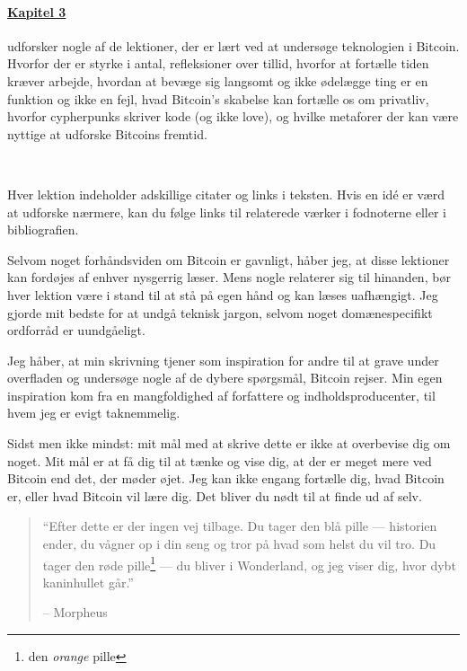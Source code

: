 \paragraph{\hyperref[ch:technology]{Kapitel 3}}{ udforsker nogle af de 
lektioner, der er lært ved at undersøge teknologien i Bitcoin. Hvorfor der er 
styrke i antal, refleksioner over tillid, hvorfor at fortælle tiden kræver 
arbejde, hvordan at bevæge sig langsomt og ikke ødelægge ting er en funktion og 
ikke en fejl, hvad Bitcoin's skabelse kan fortælle os om privatliv, hvorfor 
cypherpunks skriver kode (og ikke love), og hvilke metaforer der kan være 
nyttige at udforske Bitcoins fremtid.}

~

Hver lektion indeholder adskillige citater og links i teksten. Hvis en idé er
værd at udforske nærmere, kan du følge links til relaterede værker i
fodnoterne eller i bibliografien.

Selvom noget forhåndsviden om Bitcoin er gavnligt, håber jeg, at disse
lektioner kan fordøjes af enhver nysgerrig læser. Mens nogle relaterer sig til 
hinanden, bør hver lektion være i stand til at stå på egen hånd og kan læses 
uafhængigt. Jeg gjorde mit bedste for at undgå teknisk jargon, selvom noget 
domænespecifikt ordforråd er uundgåeligt.

Jeg håber, at min skrivning tjener som inspiration for andre til at grave under
overfladen og undersøge nogle af de dybere spørgsmål, Bitcoin rejser. Min egen
inspiration kom fra en mangfoldighed af forfattere og indholdsproducenter, til 
hvem jeg er evigt taknemmelig.

Sidst men ikke mindst: mit mål med at skrive dette er ikke at overbevise dig om 
noget. Mit mål er at få dig til at tænke og vise dig, at der er meget mere ved 
Bitcoin end det, der møder øjet. Jeg kan ikke engang fortælle dig, hvad Bitcoin 
er, eller hvad Bitcoin vil lære dig. Det bliver du nødt til at finde ud af selv.

\begin{quotation}\begin{samepage}
\enquote{Efter dette er der ingen vej tilbage. Du tager den blå pille --- 
historien ender, du vågner op i din seng og tror på hvad som helst du vil tro. 
Du tager den røde pille\footnote{den \textit{orange} pille} --- du bliver i 
Wonderland, og jeg viser dig, hvor dybt kaninhullet går.}
\begin{flushright} -- Morpheus
\end{flushright}\end{samepage}\end{quotation}

